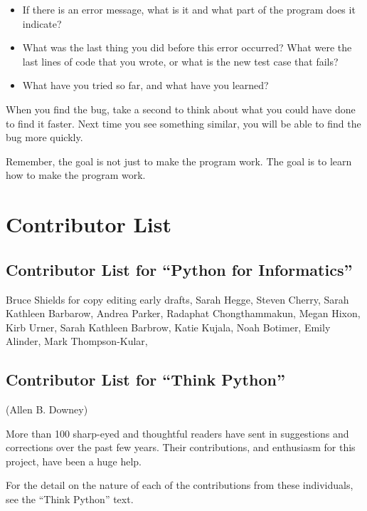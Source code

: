 \documentclass[10pt]{book}
\begin{document}
\begin{itemize}

\item If there is an error message, what is it
and what part of the program does it indicate?

\item What was the last thing you did before this error occurred?
What were the last lines of code that you wrote, or what is
the new test case that fails?

\item What have you tried so far, and what have you learned?

\end{itemize}

When you find the bug, take a second to think about what you
could have done to find it faster.  Next time you see something
similar, you will be able to find the bug more quickly.

Remember, the goal is not just to make the program
work.  The goal is to learn how to make the program work.



\chapter{Contributor List}
\section*{Contributor List for ``Python for Informatics''}

Bruce Shields for copy editing early drafts,
Sarah Hegge,
Steven Cherry,
Sarah Kathleen Barbarow,
Andrea Parker,
Radaphat Chongthammakun,
Megan Hixon,
Kirb Urner,
Sarah Kathleen Barbrow,
Katie Kujala,
Noah Botimer,
Emily Alinder,
Mark Thompson-Kular,


\section*{Contributor List for ``Think Python''}


(Allen B. Downey)

More than 100 sharp-eyed and thoughtful readers have sent in
suggestions and corrections over the past few years.  Their
contributions, and enthusiasm for this project, have been a
huge help.

For the detail on the nature of each of the contributions from
these individuals, see the ``Think Python'' text.
\end{document}
